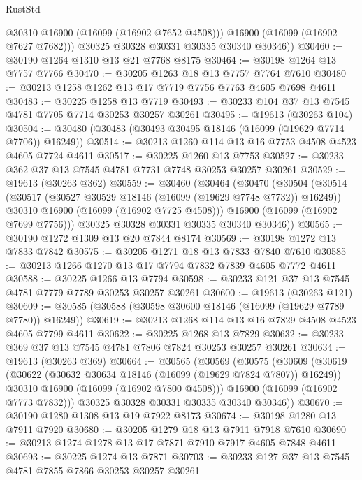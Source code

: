 \begin{lexlean}{RustStd}
\begin{coremodule}
            @30310
            @16900
            (@16099 (@16902 @7652 @4508)))
          @16900
          (@16099 (@16902 @7627 @7682)))
        @30325
        @30328
        @30331
        @30335
        @30340
        @30346))
@30460 := @30190 @1264 @1310 @13 @21 @7768 @8175
@30464 := @30198 @1264 @13 @7757 @7766
@30470 := @30205 @1263 @18 @13 @7757 @7764 @7610
@30480 := @30213 @1258 @1262 @13 @17 @7719 @7756 @7763 @4605 @7698 @4611
@30483 := @30225 @1258 @13 @7719
@30493 := @30233 @104 @37 @13 @7545 @4781 @7705 @7714 @30253 @30257 @30261
@30495 := @19613 (@30263 @104)
@30504 := @30480 (@30483 (@30493 @30495 @18146 (@16099 (@19629 @7714 @7706)) @16249))
@30514 := @30213 @1260 @114 @13 @16 @7753 @4508 @4523 @4605 @7724 @4611
@30517 := @30225 @1260 @13 @7753
@30527 := @30233 @362 @37 @13 @7545 @4781 @7731 @7748 @30253 @30257 @30261
@30529 := @19613 (@30263 @362)
@30559 := @30460
    (@30464
      (@30470
        (@30504
          (@30514
            (@30517 (@30527 @30529 @18146 (@16099 (@19629 @7748 @7732)) @16249))
            @30310
            @16900
            (@16099 (@16902 @7725 @4508)))
          @16900
          (@16099 (@16902 @7699 @7756)))
        @30325
        @30328
        @30331
        @30335
        @30340
        @30346))
@30565 := @30190 @1272 @1309 @13 @20 @7844 @8174
@30569 := @30198 @1272 @13 @7833 @7842
@30575 := @30205 @1271 @18 @13 @7833 @7840 @7610
@30585 := @30213 @1266 @1270 @13 @17 @7794 @7832 @7839 @4605 @7772 @4611
@30588 := @30225 @1266 @13 @7794
@30598 := @30233 @121 @37 @13 @7545 @4781 @7779 @7789 @30253 @30257 @30261
@30600 := @19613 (@30263 @121)
@30609 := @30585 (@30588 (@30598 @30600 @18146 (@16099 (@19629 @7789 @7780)) @16249))
@30619 := @30213 @1268 @114 @13 @16 @7829 @4508 @4523 @4605 @7799 @4611
@30622 := @30225 @1268 @13 @7829
@30632 := @30233 @369 @37 @13 @7545 @4781 @7806 @7824 @30253 @30257 @30261
@30634 := @19613 (@30263 @369)
@30664 := @30565
    (@30569
      (@30575
        (@30609
          (@30619
            (@30622 (@30632 @30634 @18146 (@16099 (@19629 @7824 @7807)) @16249))
            @30310
            @16900
            (@16099 (@16902 @7800 @4508)))
          @16900
          (@16099 (@16902 @7773 @7832)))
        @30325
        @30328
        @30331
        @30335
        @30340
        @30346))
@30670 := @30190 @1280 @1308 @13 @19 @7922 @8173
@30674 := @30198 @1280 @13 @7911 @7920
@30680 := @30205 @1279 @18 @13 @7911 @7918 @7610
@30690 := @30213 @1274 @1278 @13 @17 @7871 @7910 @7917 @4605 @7848 @4611
@30693 := @30225 @1274 @13 @7871
@30703 := @30233 @127 @37 @13 @7545 @4781 @7855 @7866 @30253 @30257 @30261

\end{coremodule}
\end{lexlean}
